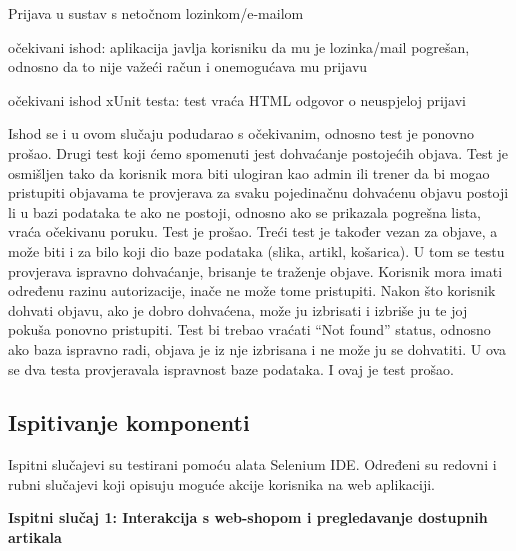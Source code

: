 		 	\begin{packed_item}
		 	
		 	\item Prijava u sustav s netočnom lozinkom/e-mailom
		 	\item[] \begin{packed_enum}
		 		\item očekivani ishod: aplikacija javlja korisniku da mu je lozinka/mail pogrešan, odnosno da to nije važeći račun i onemogućava mu prijavu
		 		\item očekivani ishod xUnit testa: test vraća HTML odgovor o neuspjeloj prijavi
		 		
		 	\end{packed_enum}
		 \end{packed_item}
		 \textnormal {Ishod se i u ovom slučaju podudarao s očekivanim, odnosno test je ponovno prošao.}
		 \bigbreak
		 \textnormal {Drugi test koji ćemo spomenuti jest dohvaćanje postojećih objava. Test je osmišljen tako da korisnik mora biti ulogiran kao admin ili trener da bi mogao pristupiti objavama te provjerava za svaku pojedinačnu dohvaćenu objavu postoji li u bazi podataka te ako ne postoji, odnosno ako se prikazala pogrešna lista, vraća očekivanu poruku. Test je prošao.}
		 \bigbreak
		 \textnormal{Treći test je također vezan za objave, a može biti i za bilo koji dio baze podataka (slika, artikl, košarica). U tom se testu provjerava ispravno dohvaćanje, brisanje te traženje objave. Korisnik mora imati određenu razinu autorizacije, inače ne može tome pristupiti. Nakon što korisnik dohvati objavu, ako je dobro dohvaćena, može ju izbrisati i izbriše ju te joj pokuša ponovno pristupiti. Test bi trebao vraćati “Not found” status, odnosno ako baza ispravno radi, objava je iz nje izbrisana i ne može ju se dohvatiti. U ova se dva testa provjeravala ispravnost baze podataka. I ovaj je test prošao.
		 }
	
			
			\subsection{Ispitivanje komponenti}
			
			\textnormal{Ispitni slučajevi su testirani pomoću alata Selenium IDE. Određeni su redovni i rubni slučajevi koji opisuju moguće akcije korisnika na web aplikaciji.\\}
		 	
		 	\textnormal{\textbf{Ispitni slučaj 1: Interakcija s web-shopom i pregledavanje dostupnih artikala\\}}
		 	
